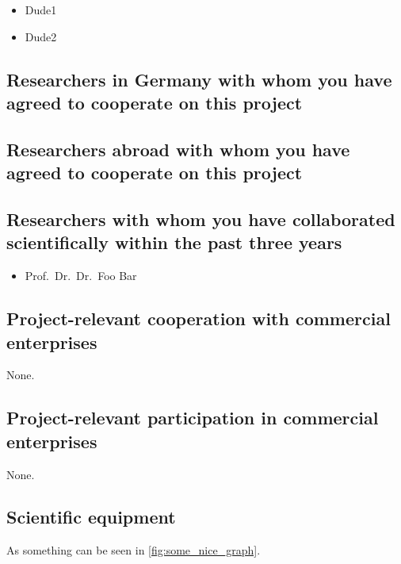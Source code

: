 \documentclass{scrartcl}
\begin{document}
\begin{itemize}
\item Dude1
\item Dude2
\end{itemize}

\subsection{Researchers in Germany with whom you have agreed to cooperate on this project}

\subsection{Researchers abroad with whom you have agreed to cooperate on this project}

\subsection{Researchers with whom you have collaborated scientifically within the past three years}
\begin{itemize}
  \item Prof.\ Dr.\ Dr.\ Foo Bar
\end{itemize}

\subsection{Project-relevant cooperation with commercial enterprises}
None.

\subsection{Project-relevant participation in commercial enterprises}
None.

\subsection{Scientific equipment}
As something can be seen in \cref{fig:some_nice_graph}.
\end{document}
